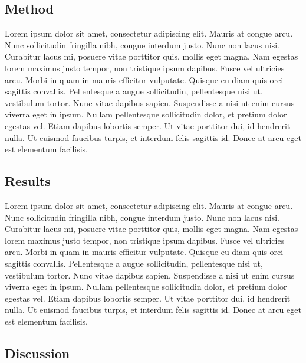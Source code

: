 \subsection{Method}

Lorem ipsum dolor sit amet, consectetur adipiscing elit. Mauris at congue arcu. Nunc sollicitudin fringilla nibh, congue interdum justo. Nunc non lacus nisi. Curabitur lacus mi, posuere vitae porttitor quis, mollis eget magna. Nam egestas lorem maximus justo tempor, non tristique ipsum dapibus. Fusce vel ultricies arcu. Morbi in quam in mauris efficitur vulputate. Quisque eu diam quis orci sagittis convallis. Pellentesque a augue sollicitudin, pellentesque nisi ut, vestibulum tortor. Nunc vitae dapibus sapien. Suspendisse a nisi ut enim cursus viverra eget in ipsum. Nullam pellentesque sollicitudin dolor, et pretium dolor egestas vel. Etiam dapibus lobortis semper. Ut vitae porttitor dui, id hendrerit nulla. Ut euismod faucibus turpis, et interdum felis sagittis id. Donec at arcu eget est elementum facilisis.

\subsection{Results}

Lorem ipsum dolor sit amet, consectetur adipiscing elit. Mauris at congue arcu. Nunc sollicitudin fringilla nibh, congue interdum justo. Nunc non lacus nisi. Curabitur lacus mi, posuere vitae porttitor quis, mollis eget magna. Nam egestas lorem maximus justo tempor, non tristique ipsum dapibus. Fusce vel ultricies arcu. Morbi in quam in mauris efficitur vulputate. Quisque eu diam quis orci sagittis convallis. Pellentesque a augue sollicitudin, pellentesque nisi ut, vestibulum tortor. Nunc vitae dapibus sapien. Suspendisse a nisi ut enim cursus viverra eget in ipsum. Nullam pellentesque sollicitudin dolor, et pretium dolor egestas vel. Etiam dapibus lobortis semper. Ut vitae porttitor dui, id hendrerit nulla. Ut euismod faucibus turpis, et interdum felis sagittis id. Donec at arcu eget est elementum facilisis.

\subsection{Discussion}

